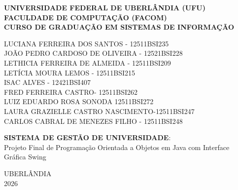 \documentclass[12pt, a4paper]{article}
\begin{document}
\begin{titlepage}
    \begin{center}
        \textbf{UNIVERSIDADE FEDERAL DE UBERLÂNDIA (UFU)} \\
        \textbf{FACULDADE DE COMPUTAÇÃO (FACOM)} \\
        \textbf{CURSO DE GRADUAÇÃO EM SISTEMAS DE INFORMAÇÃO}

        \vspace{2.5cm}

        LUCIANA FERREIRA DOS SANTOS - 12511BSI235 \\
        JOÃO PEDRO CARDOSO DE OLIVEIRA - 12521BSI228 \\
        LETHICIA FERREIRA DE ALMEIDA - 12511BSI209 \\
        LETÍCIA MOURA LEMOS - 12511BSI215 \\
        ⁠ISAC ALVES - 12421BSI407 \\
        FRED FERREIRA CASTRO- 12511BSI262 \\
        LUIZ EDUARDO ROSA SONODA 12511BSI272 \\
        LAURA GRAZIELLE CASTRO NASCIMENTO-12511BSI247 \\
        CARLOS CABRAL DE MENEZES FILHO - 12511BSI248 \\

        \vfill

        \textbf{SISTEMA DE GESTÃO DE UNIVERSIDADE}: \\
        Projeto Final de Programação Orientada a Objetos em Java com Interface Gráfica Swing

        \vfill

        UBERLÂNDIA \\
        2026
    \end{center}
\end{titlepage}
\end{document}
